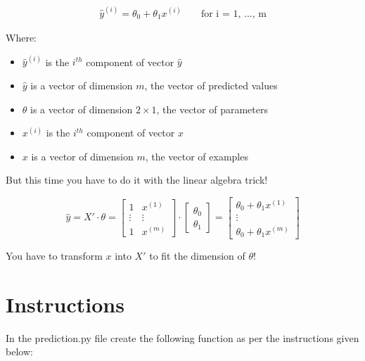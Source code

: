 \documentclass{42-en}
\begin{document}
$$
\begin{matrix}
\hat{y}^{(i)} = \theta_0 + \theta_1 x^{(i)} & &\text{ for i = 1, ..., m}
\end{matrix}
$$  

Where:
\begin{itemize}
  \item $\hat{y}^{(i)}$ is the $i^{th}$ component of vector $\hat{y}$
  \item $\hat{y}$ is a vector of dimension $m$, the vector of predicted values
  \item $\theta$ is a vector of dimension $2 \times 1$, the vector of parameters
  \item $x^{(i)}$ is the $i^{th}$ component of vector $x$  
  \item $x$ is a vector of dimension $m$, the vector of examples
\end{itemize}

But this time you have to do it with the linear algebra trick!

$$
\hat{y} = X' \cdot \theta = 
\begin{bmatrix} 
1 & x^{(1)} \\ 
\vdots & \vdots \\ 
1 & x^{(m)} 
\end{bmatrix} 
\cdot
\begin{bmatrix}
\theta_0 \\ 
\theta_1 
\end{bmatrix} 
 = \begin{bmatrix} 
\theta_0 + \theta_1x^{(1)} \\ 
\vdots \\ 
\theta_0 + \theta_1x^{(m)} 
\end{bmatrix} 
$$


You have to transform $x$ into $X'$ to fit the dimension of $\theta$!


\section*{Instructions}
In the prediction.py file create the following function as per the instructions given below:
\end{document}
